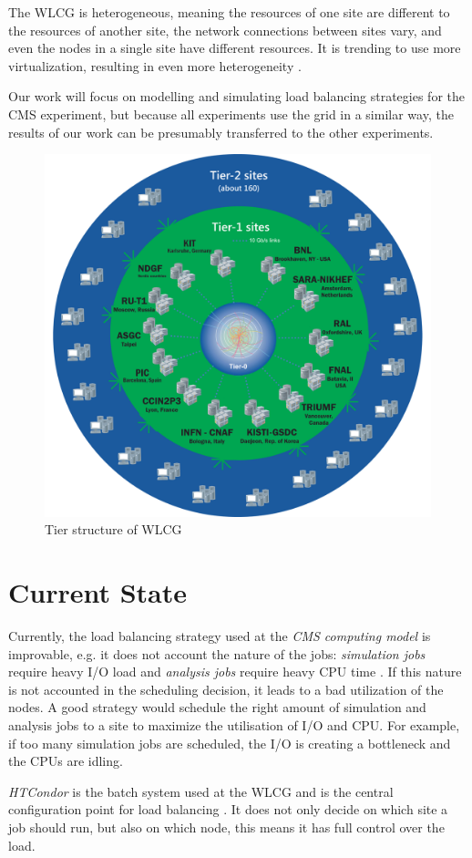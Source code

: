 The WLCG is heterogeneous, meaning the resources of one site are different to the resources of another site, the network connections between sites vary, and even the nodes in a single site have different resources. It is trending to use more virtualization, resulting in even more heterogeneity \cite{wlcg_update}.

Our work will focus on modelling and simulating load balancing strategies for the CMS experiment, but because all experiments use the grid in a similar way, the results of our work can be presumably transferred to the other experiments.

	\begin{figure}
		\centering
		\includegraphics[width=0.65\linewidth]{images/WLCG}
		\caption[]{Tier structure of WLCG \cite{wlcg_tiers}}
		\label{fig:wlcg}
	\end{figure}
	

\section{Current State}
Currently, the load balancing strategy used at the \textit{CMS computing model} is improvable, e.g. it does not account the nature of the jobs: \textit{simulation jobs} require heavy I/O load and \textit{analysis jobs} require heavy CPU time \cite{1742-6596-331-7-072038}. If this nature is not accounted in the scheduling decision, it leads to a bad utilization of the nodes. A good strategy would schedule the right amount of simulation and analysis jobs to a site to maximize the utilisation of I/O and CPU. For example, if too many simulation jobs are scheduled, the I/O is creating a bottleneck and the CPUs are idling. 

\textit{HTCondor} is the batch system used at the WLCG and is the central configuration point for load balancing \cite{wlcg_update}.
It does not only decide on which site a job should run, but also on which node, this means it has full control over the load.

